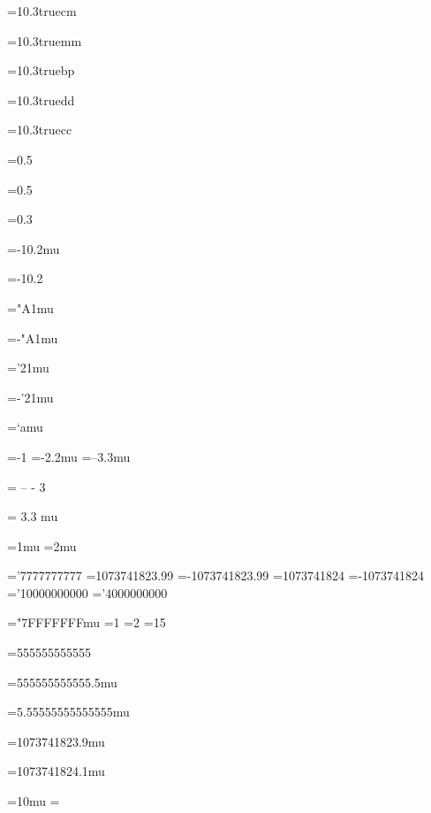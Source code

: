 =10.3truecm
\showthe{}

=10.3truemm
\showthe{}

=10.3truebp
\showthe{}

=10.3truedd
\showthe{}

=10.3truecc
\showthe{}

=0.5
\showthe{}

=0.5
\showthe{}

=0.3
\showthe{}

=-10.2mu
\showthe{}

=-10.2
\showthe{}

="A1mu
\showthe{}

=-"A1mu
\showthe{}

='21mu
\showthe{}

=-'21mu
\showthe{}

=`amu
\showthe{}

=-1
\showthe{}
=-2.2mu
\showthe{}
=--3.3mu
\showthe{}

  =  -- - 3  
\showthe{}

 = 3.3  mu
\showthe{}

=1mu
=2mu

='7777777777
\showthe{}
=1073741823.99
\showthe{}
=-1073741823.99
\showthe{}
=1073741824
\showthe{}
=-1073741824
\showthe{}
='10000000000
\showthe{}
='4000000000
\showthe{}

="7FFFFFFFmu
=1
\showthe{}
=2
\showthe{}
=15
\showthe{}

=555555555555
\showthe{}

=555555555555.5mu
\showthe{}

=5.55555555555555mu
\showthe{}

=1073741823.9mu
\showthe{}

=1073741824.1mu
\showthe{}

=10mu
=\relax\relax
\showthe{}

